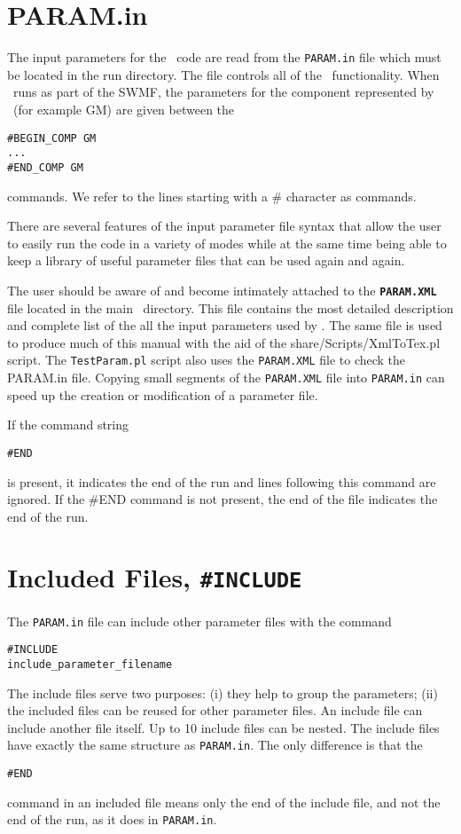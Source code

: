 %

\section{PARAM.in \label{section:param.in}}

The input parameters for the \BATSRUS\ code are read from the 
{\tt PARAM.in} file which must be located in the run directory.
The file controls all of the \BATSRUS\ functionality.
When \BATSRUS\ runs as part of the SWMF, the parameters for 
the component represented by \BATSRUS\ (for example GM) are
given between the 
\begin{verbatim}
#BEGIN_COMP GM
...
#END_COMP GM
\end{verbatim}
commands. We refer to the lines starting with a \# character as commands.

There are several features of the input parameter file syntax
that allow the user to easily run the code
in a variety of modes while at the same time being able to 
keep a library of useful parameter files that can be used
again and again.

The user should be aware of and become intimately attached to the 
{\bf {\tt PARAM.XML}} file located in the main \BATSRUS\ directory.  
This file contains the most detailed 
description and complete list of the all the input parameters
used by \BATSRUS. The same file is used to produce much of this
manual with the aid of the share/Scripts/XmlToTex.pl script. 
The {\tt TestParam.pl} script also uses the {\tt PARAM.XML} file
to check the PARAM.in file.
Copying small segments of the {\tt PARAM.XML} file
into {\tt PARAM.in} can speed up the creation or modification of a 
parameter file. 

If the command string 
\begin{verbatim}
#END
\end{verbatim}
is present, it indicates the end of the run and lines following
this command are ignored. If the \#END command is not
present, the end of the file indicates the end of the run.

\section{Included Files, {\tt \#INCLUDE} \label{section:include}}

The {\tt PARAM.in} file can include other parameter files with the 
command
\begin{verbatim}
#INCLUDE
include_parameter_filename
\end{verbatim}
The include files serve two purposes: (i) they help
to group the parameters; (ii) the included files can be reused
for other parameter files. 
An include file can include another file itself.
Up to 10 include files can be nested.
The include files have exactly the same structure as {\tt PARAM.in}. 
The only difference is that the
\begin{verbatim}
#END
\end{verbatim}
command in an included file means only the end of the include file, 
and not the end of the run, as it does in {\tt PARAM.in}.

